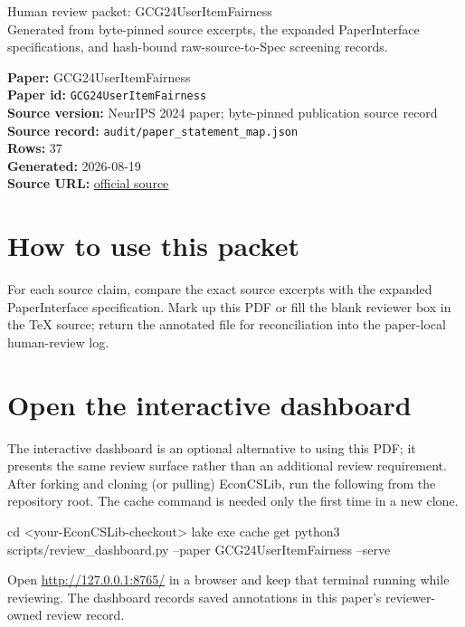 \documentclass[10pt]{article}
\begin{document}
\fontsize{9}{10}\selectfont

\begin{center}
{\LARGE Human review packet: GCG24UserItemFairness}\\[0.35em]
\small Generated from byte-pinned source excerpts, the expanded PaperInterface
specifications, and hash-bound raw-source-to-Spec screening records.
\end{center}

\noindent\textbf{Paper:} GCG24UserItemFairness\\
\textbf{Paper id:} \texttt{GCG24UserItemFairness}\\
\textbf{Source version:} NeurIPS 2024 paper; byte-pinned publication source record\\
\textbf{Source record:} \texttt{audit/paper\_statement\_map.json}\\
\textbf{Rows:} 37\\
\textbf{Generated:} 2026-08-19\\
\textbf{Source URL:} \href{https://openreview.net/pdf?id=ZOZjMs3JTs}{official source}

\noindent{}\par



\section*{How to use this packet}
For each source claim, compare the exact source excerpts with the expanded
PaperInterface specification. Mark up this PDF or fill the blank reviewer box in the TeX source;
return the annotated file for reconciliation into the paper-local human-review
log.

\section*{Open the interactive dashboard}
The interactive dashboard is an optional alternative to using this PDF; it
presents the same review surface rather than an additional review requirement.
After forking and cloning (or pulling) EconCSLib, run the following from the
repository root. The cache command is needed only the first time in a new clone.
\begin{ReviewVerbatim}
cd <your-EconCSLib-checkout>
lake exe cache get
python3 scripts/review_dashboard.py --paper GCG24UserItemFairness --serve
\end{ReviewVerbatim}
Open \url{http://127.0.0.1:8765/} in a browser and keep that terminal running
while reviewing. The dashboard records saved annotations in this paper's
reviewer-owned review record.
\end{document}
